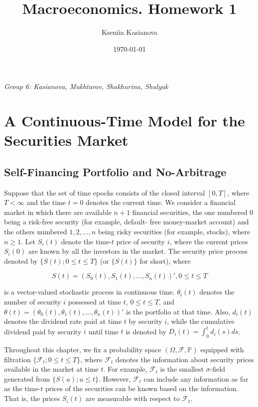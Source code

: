 \documentclass[a4paper,12pt]{article} %
\author{Kseniia Kasianova}
\title{Macroeconomics. Homework 1}
\date{\today}
\newcommand{\latinword}[1]{\textsf{\itshape #1}}%
\begin{document}
{ \latinword{Group 6: Kasianova, Mukhtarov, Shakhurina, Shulyak}}

\noindent\makebox[\linewidth]{\rule{\textwidth}{0.4pt}}


\section*{A Continuous-Time Model for the	Securities Market}

\subsection*{Self-Financing Portfolio and No-Arbitrage}

Suppose that the set of time epochs consists of the closed interval $[0, T]$,
where $T < \infty$ and the time $t = 0$ denotes the current time. We consider a financial market in which there are available $n + 1$ financial
securities, the one numbered $0$ being a risk-free security (for example, default-
free money-market account) and the others numbered $1, 2, . . . , n$ being risky
securities (for example, stocks), where $n \geq 1$.
Let $S_i(t)$ denote the time-$t$ price of security $i$, where the current prices
$S_i(0)$ are known by all the investors in the market. The security price process
denoted by $\{S(t); 0 \leq t \leq T\}$ (or $\{S(t)\}$ for short), where

$$S(t) = (S_0(t), S_1(t), . . . , S_n(t))', 0 \leq t \leq T$$

is a vector-valued stochastic process in continuous time.  $\theta_i(t)$ denotes the number of security $i$
possessed at time $t$, $0 \leq t \leq T$, and $\theta(t) = (\theta_0(t), \theta_1(t), . . . , \theta_n(t))'$ is the
portfolio at that time. Also, $d_i(t)$ denotes the dividend rate paid at time $t$
by security $i$, while the cumulative dividend paid by security $i$ until time $t$ is
denoted by $D_i(t) = \int^t_0 d_i(s)ds$.


Throughout this chapter, we fix a probability space $(\Omega, \mathcal{F}, \mathbb{P})$ equipped with
filtration $\{\mathcal{F}_t; 0 \leq t \leq T\}$, where $\mathcal{F}_t$ denotes the information about security
prices available in the market at time $t$. For example, $\mathcal{F}_t$ is the smallest $\sigma$-field
generated from $\{S(u); u \leq t\}$. However, $\mathcal{F}_t$ can include any information as far 
as the time-$t$ prices of the securities can be known based on the information.
That is, the prices $S_i(t)$ are measurable with respect to $\mathcal{F}_t$.
\end{document}
